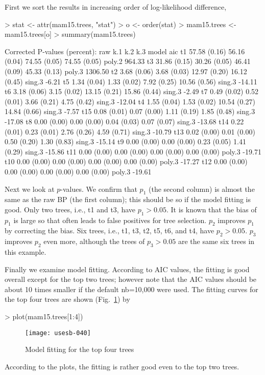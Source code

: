 \documentclass[a4paper]{amsart}
\begin{document}
First we sort the results in increasing order of log-likelihood difference,
\begin{Schunk}
\begin{Sinput}
> stat <- attr(mam15.trees, "stat")
> o <- order(stat)
> mam15.trees <- mam15.trees[o]
> summary(mam15.trees)
\end{Sinput}
\begin{Soutput}
Corrected P-values (percent):
    raw          k.1          k.2          k.3          model  aic     
t1  57.58 (0.16) 56.16 (0.04) 74.55 (0.05) 74.55 (0.05) poly.2  964.33 
t3  31.86 (0.15) 30.26 (0.05) 46.41 (0.09) 45.33 (0.13) poly.3 1306.50 
t2   3.68 (0.06)  3.68 (0.03) 12.97 (0.20) 16.12 (0.45) sing.3   -6.21 
t5   1.34 (0.04)  1.33 (0.02)  7.92 (0.25) 10.56 (0.56) sing.3  -14.11 
t6   3.18 (0.06)  3.15 (0.02) 13.15 (0.21) 15.86 (0.44) sing.3   -2.49 
t7   0.49 (0.02)  0.52 (0.01)  3.66 (0.21)  4.75 (0.42) sing.3  -12.04 
t4   1.55 (0.04)  1.53 (0.02) 10.54 (0.27) 14.84 (0.66) sing.3   -7.57 
t15  0.08 (0.01)  0.07 (0.00)  1.11 (0.19)  1.85 (0.48) sing.3  -17.08 
t8   0.00 (0.00)  0.00 (0.00)  0.04 (0.03)  0.07 (0.07) sing.3  -13.68 
t14  0.22 (0.01)  0.23 (0.01)  2.76 (0.26)  4.59 (0.71) sing.3  -10.79 
t13  0.02 (0.00)  0.01 (0.00)  0.50 (0.20)  1.30 (0.83) sing.3  -15.14 
t9   0.00 (0.00)  0.00 (0.00)  0.23 (0.05)  1.41 (0.29) sing.3  -15.86 
t11  0.00 (0.00)  0.00 (0.00)  0.00 (0.00)  0.00 (0.00) poly.3  -19.71 
t10  0.00 (0.00)  0.00 (0.00)  0.00 (0.00)  0.00 (0.00) poly.3  -17.27 
t12  0.00 (0.00)  0.00 (0.00)  0.00 (0.00)  0.00 (0.00) poly.3  -19.61 
\end{Soutput}
\end{Schunk}

Next we look at $p$-values. We confirm that $p_1$ (the second column)
is almost the same as the raw BP (the first column); this should be so
if the model fitting is good. Only two trees, i.e., t1 and t3, have
$p_1>0.05$. It is known that the bias of $p_1$ is large so that often
leads to false positives for tree selection. $p_2$ improves $p_1$ by
correcting the bias. Six trees, i.e., t1, t3, t2, t5, t6, and t4, have
$p_2>0.05$. $p_3$ improves $p_2$ even more, although the trees of
$p_3>0.05$ are the same six trees in this example.


Finally we examine model fitting.  According to AIC values, the
fitting is good overall except for the top two trees; however note
that the AIC values should be about 10 times smaller if the default
nb=10,000 were used.  The fitting curves for the top four trees are
shown (Fig.~\ref{fig:mamplots}) by
\begin{Schunk}
\begin{Sinput}
> plot(mam15.trees[1:4])
\end{Sinput}
\end{Schunk}
\begin{figure}
\begin{center}
\texttt{[image: usesb-040]}
\caption{Model fitting for the top four trees}\label{fig:mamplots}
\end{center}
\end{figure}
According to the plots, the fitting is rather good even to the top two
trees. 
\end{document}
